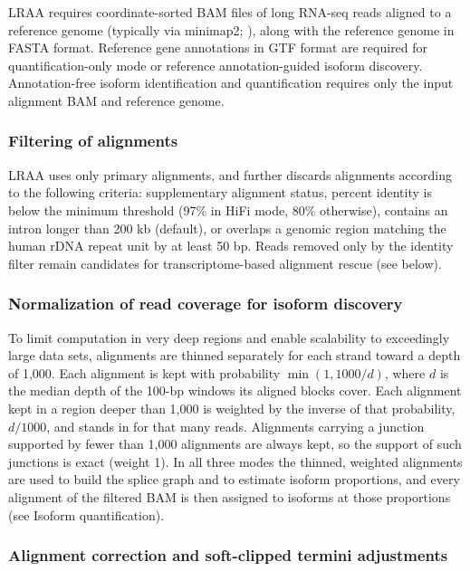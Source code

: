 LRAA requires coordinate-sorted BAM files of long RNA-seq reads aligned to a reference genome (typically via minimap2; \citealp{li2018}), along with the reference genome in FASTA format. Reference gene annotations in GTF format are required for quantification-only mode or reference annotation-guided isoform discovery. Annotation-free isoform identification and quantification requires only the input alignment BAM and reference genome.

\subsubsection{Filtering of alignments}\label{filtering-of-alignments}

LRAA uses only primary alignments, and further discards alignments according to the following criteria: supplementary alignment status, percent identity is below the minimum threshold (97\% in HiFi mode, 80\% otherwise), contains an intron longer than 200 kb (default), or overlaps a genomic region matching the human rDNA repeat unit by at least 50 bp. Reads removed only by the identity filter remain candidates for transcriptome-based alignment rescue (see below).

\subsubsection{Normalization of read coverage for isoform discovery}\label{normalization-of-read-coverage-for-isoform-discovery}

To limit computation in very deep regions and enable scalability to exceedingly large data sets, alignments are thinned separately for each strand toward a depth of 1,000. Each alignment is kept with probability $\min(1, 1000/d)$, where $d$ is the median depth of the 100-bp windows its aligned blocks cover. Each alignment kept in a region deeper than 1,000 is weighted by the inverse of that probability, $d/1000$, and stands in for that many reads. Alignments carrying a junction supported by fewer than 1,000 alignments are always kept, so the support of such junctions is exact (weight 1). In all three modes the thinned, weighted alignments are used to build the splice graph and to estimate isoform proportions, and every alignment of the filtered BAM is then assigned to isoforms at those proportions (see Isoform quantification).

\subsubsection{Alignment correction and soft-clipped termini adjustments}\label{alignment-correction-and-soft-clipped-termini-adjustments}

